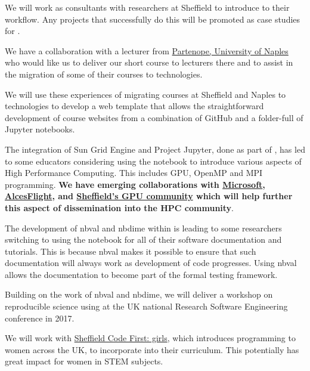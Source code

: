 \begin{workpackage}
\begin{tasklist}
\begin{task}[title=Introduce \TheProject to Researchers and Teachers, id=project-intro,lead=USH,wphases=6-44,PM=20,partners={USO,XFEL}, issue=29]
We will work as consultants with researchers at Sheffield to
  introduce \TheProject to their workflow. Any projects that
  successfully do this will be promoted as case studies for
  \TheProject.

We have a collaboration with a lecturer from \href{https://en.wikipedia.org/wiki/Parthenope_University_of_Naples}{Partenope,
  University of Naples} who would like us to deliver our short course to lecturers there
  and to assist in the migration of some of their courses to \TheProject technologies.

We will use these experiences of migrating courses at Sheffield and Naples to \TheProject technologies
to develop a web template that allows the straightforward development of course websites from a
combination of GitHub and a folder-full of Jupyter notebooks.

The integration of Sun Grid Engine and Project Jupyter, done as part of \TheProject, has led to some educators considering using the notebook to introduce various aspects of High
Performance Computing. This includes GPU, OpenMP and MPI
  programming. \textbf{We have emerging collaborations with
    \href{https://notebooks.azure.com/}{Microsoft},
    \href{http://alces-flight.com/}{AlcesFlight}, and
    \href{http://gpucomputing.shef.ac.uk/}{Sheffield's GPU community}
    which will help further this aspect of \TheProject dissemination into the
    HPC community}.

The development of nbval and nbdime within \TheProject is
leading to some researchers switching to using the notebook for all
of their software documentation and tutorials. This is because
nbval makes it possible to ensure that such documentation will
always work as development of code progresses.
Using nbval allows the documentation to become part of
the formal testing framework.

Building on the work of nbval and nbdime,
we will deliver a workshop on reproducible science using \TheProject at
the UK national Research Software Engineering conference in 2017.

We will work with \href{http://rse.shef.ac.uk/blog/sheffield-code-firstgirls/}{Sheffield Code First: girls}, which introduces programming to women across the UK,
  to incorporate \TheProject into their curriculum.
This potentially has great impact for women in STEM subjects.


\end{task}
\end{tasklist}
\end{workpackage}
